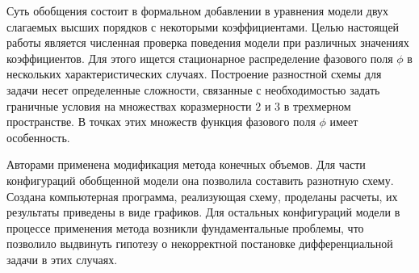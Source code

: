 Суть обобщения состоит в формальном добавлении в уравнения модели двух слагаемых высших порядков с некоторыми коэффициентами. Целью настоящей работы является численная проверка поведения модели при различных значениях коэффициентов. Для этого ищется стационарное распределение фазового поля $\phi$ в нескольких характеристических случаях. Построение разностной схемы для задачи несет определенные сложности, связанные с необходимостью задать граничные условия на множествах коразмерности $2$ и $3$ в трехмерном пространстве. В точках этих множеств функция фазового поля $\phi$ имеет особенность.

Авторами применена модификация метода конечных объемов. Для части конфигураций обобщенной модели она позволила составить разнотную схему. Создана компьютерная программа, реализующая схему, проделаны расчеты, их результаты приведены в виде графиков. Для остальных конфигураций модели в процессе применения метода возникли фундаментальные проблемы, что позволило выдвинуть гипотезу о некорректной постановке дифференциальной задачи в этих случаях.